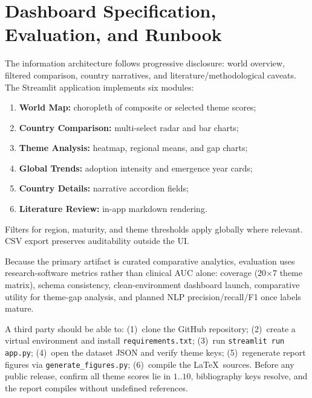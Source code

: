 \section{Dashboard Specification, Evaluation, and Runbook}
\label{sec:app-method-funcspec}

The information architecture follows progressive disclosure: world overview,
filtered comparison, country narratives, and literature/methodological caveats.
The Streamlit application implements six modules:
\begin{enumerate}[noitemsep]
  \item \textbf{World Map:} choropleth of composite or selected theme scores;
  \item \textbf{Country Comparison:} multi-select radar and bar charts;
  \item \textbf{Theme Analysis:} heatmap, regional means, and gap charts;
  \item \textbf{Global Trends:} adoption intensity and emergence year cards;
  \item \textbf{Country Details:} narrative accordion fields;
  \item \textbf{Literature Review:} in-app markdown rendering.
\end{enumerate}
Filters for region, maturity, and theme thresholds apply globally where relevant.
CSV export preserves auditability outside the UI.

Because the primary artifact is curated comparative analytics, evaluation uses
research-software metrics rather than clinical AUC alone: coverage (20$\times$7
theme matrix), schema consistency, clean-environment dashboard launch, comparative
utility for theme-gap analysis, and planned NLP precision/recall/F1 once labels
mature.

A third party should be able to: (1)~clone the GitHub repository;
(2)~create a virtual environment and install \texttt{requirements.txt};
(3)~run \texttt{streamlit run app.py}; (4)~open the dataset JSON and verify theme
keys; (5)~regenerate report figures via \texttt{generate\_figures.py};
(6)~compile the \LaTeX\ sources. Before any public release, confirm all theme
scores lie in $1..10$, bibliography keys resolve, and the report compiles without
undefined references.
